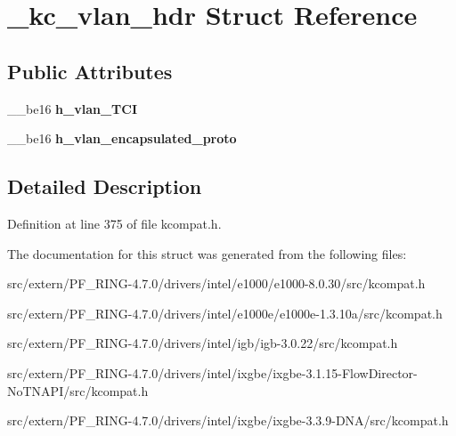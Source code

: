 \hypertarget{struct__kc__vlan__hdr}{
\section{\_\-kc\_\-vlan\_\-hdr Struct Reference}
\label{struct__kc__vlan__hdr}
}
\subsection*{Public Attributes}
\begin{DoxyCompactItemize}
\item 
\hypertarget{struct__kc__vlan__hdr_a9ea380c6ace6b93749851dd62676f9df}{
\_\-\_\-be16 {\bfseries h\_\-vlan\_\-TCI}}
\label{struct__kc__vlan__hdr_a9ea380c6ace6b93749851dd62676f9df}

\item 
\hypertarget{struct__kc__vlan__hdr_a89006106d52c2207981f16f1c9a1f3a5}{
\_\-\_\-be16 {\bfseries h\_\-vlan\_\-encapsulated\_\-proto}}
\label{struct__kc__vlan__hdr_a89006106d52c2207981f16f1c9a1f3a5}

\end{DoxyCompactItemize}


\subsection{Detailed Description}


Definition at line 375 of file kcompat.h.



The documentation for this struct was generated from the following files:\begin{DoxyCompactItemize}
\item 
src/extern/PF\_\-RING-\/4.7.0/drivers/intel/e1000/e1000-\/8.0.30/src/kcompat.h\item 
src/extern/PF\_\-RING-\/4.7.0/drivers/intel/e1000e/e1000e-\/1.3.10a/src/kcompat.h\item 
src/extern/PF\_\-RING-\/4.7.0/drivers/intel/igb/igb-\/3.0.22/src/kcompat.h\item 
src/extern/PF\_\-RING-\/4.7.0/drivers/intel/ixgbe/ixgbe-\/3.1.15-\/FlowDirector-\/NoTNAPI/src/kcompat.h\item 
src/extern/PF\_\-RING-\/4.7.0/drivers/intel/ixgbe/ixgbe-\/3.3.9-\/DNA/src/kcompat.h\end{DoxyCompactItemize}
